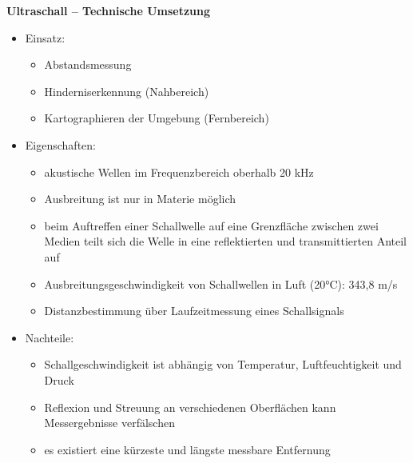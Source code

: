 \textbf{Ultraschall – Technische Umsetzung}
\begin{itemize}
\setlength\itemsep{0em}
\item Einsatz: 
\begin{itemize}
\setlength\itemsep{0em}
\item Abstandsmessung
\item Hinderniserkennung (Nahbereich)
\item Kartographieren der Umgebung (Fernbereich)
\end{itemize}
\item Eigenschaften:
\begin{itemize}
\setlength\itemsep{0em}
\item akustische Wellen im Frequenzbereich oberhalb 20 kHz
\item Ausbreitung ist nur in Materie möglich
\item beim Auftreffen einer Schallwelle auf eine Grenzfläche zwischen zwei Medien teilt sich die Welle in eine reflektierten und transmittierten Anteil auf 
\item Ausbreitungsgeschwindigkeit von Schallwellen in Luft (20°C): 343,8 m/s
\item Distanzbestimmung über Laufzeitmessung eines Schallsignals
\end{itemize}
\item Nachteile:
\begin{itemize}
\setlength\itemsep{0em}
\item Schallgeschwindigkeit ist abhängig von Temperatur, Luftfeuchtigkeit und Druck
\item Reflexion und Streuung an verschiedenen Oberflächen kann Messergebnisse verfälschen
\item es existiert eine kürzeste und längste messbare Entfernung
\end{itemize}
\end{itemize}
